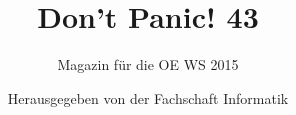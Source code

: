\begin{titlepage}

\thispagestyle{empty}
\title{\Huge{Don't Panic! 43}}
\author{Magazin für die OE WS 2015}
\date{Herausgegeben von der Fachschaft Informatik}


%

\maketitle
\newpage
\end{titlepage}
